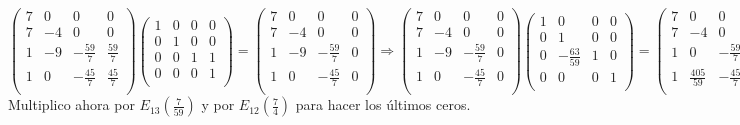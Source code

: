 \documentclass[11pt, a4paper]{article}
\newif\IfInSansMode
\theoremstyle{theorem-style}
\theoremstyle{definition-style}
\theoremstyle{remark-style}
\theoremstyle{example-style}
\begin{document}
$\begin{pmatrix}
7 & 0 & 0 & 0 \\
7 & -4 & 0 & 0 \\
1 & -9 & -\frac{59}{7} & \frac{59}{7} \\
1 & 0 & -\frac{45}{7} & \frac{45}{7} \\
\end{pmatrix}
\begin{pmatrix}
1 & 0 & 0 & 0 \\
0 & 1 & 0 & 0 \\
0 & 0 & 1 & 1 \\
0 & 0 & 0 & 1 \\
\end{pmatrix}  
 = 
\begin{pmatrix}
7 & 0 & 0 & 0 \\
7 & -4 & 0 & 0 \\
1 & -9 & -\frac{59}{7} & 0 \\
1 & 0 & -\frac{45}{7} & 0 \\
\end{pmatrix} \Longrightarrow
\begin{pmatrix}
7 & 0 & 0 & 0 \\
7 & -4 & 0 & 0 \\
1 & -9 & -\frac{59}{7} & 0 \\
1 & 0 & -\frac{45}{7} & 0 \\
\end{pmatrix}
\begin{pmatrix}
1 & 0 & 0 & 0 \\
0 & 1 & 0 & 0 \\
0 & -\frac{63}{59} & 1 & 0 \\
0 & 0 & 0 & 1 \\
\end{pmatrix}   
 = 
\begin{pmatrix}
7 & 0 & 0 & 0 \\
7 & -4 & 0 & 0 \\
1 & 0 & -\frac{59}{7} & 0 \\
1 & \frac{405}{59} & -\frac{45}{7} & 0 \\
\end{pmatrix}$ \\

Multiplico ahora por $E_{13}(\frac{7}{59})$ y por $E_{12}(\frac{7}{4})$ para hacer los últimos ceros. \\
\end{document}
